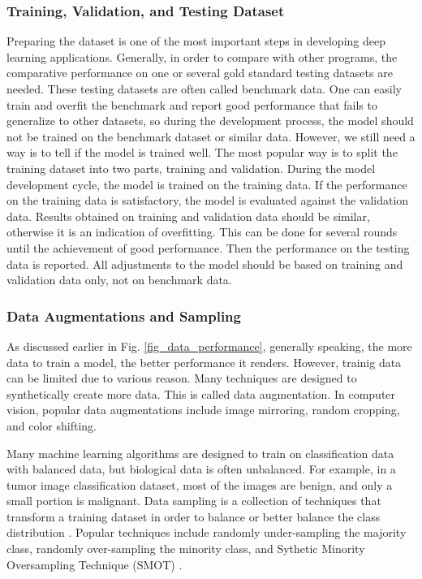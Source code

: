 \subsubsection{Training, Validation, and Testing Dataset}
Preparing the dataset is one of the most important steps in developing deep learning applications. Generally, in order to compare with other programs, the comparative performance on one or several gold standard testing datasets are needed. These testing datasets are often called benchmark data. One can easily train and overfit the benchmark and report good performance that fails to generalize to other datasets, so during the development process, the model should not be trained on the benchmark dataset or similar data. However, we still need a way is to tell if the model is trained well. The most popular way is to split the training dataset into two parts, training and validation. During the model development cycle, the model is trained on the training data. If the performance on the training data is satisfactory, the model is evaluated against the validation data. Results obtained on training and validation data should be similar, otherwise it is an indication of overfitting. This can be done for several rounds until the achievement of good performance. Then the performance on the testing data is reported. All adjustments to the model should be based on training and validation data only, not on benchmark data.
\subsubsection{Data Augmentations and Sampling}
As discussed earlier in Fig. \ref{fig_data_performance}, generally speaking, the more data to train a model, the better performance it renders. However, trainig data can be limited due to various reason. Many techniques are designed to synthetically create more data. This is called data augmentation. In computer vision, popular data augmentations include image mirroring, random cropping, and color shifting.  

Many machine learning algorithms are designed to train on classification data with balanced data, but biological data is often unbalanced. For example, in a tumor image classification dataset, most of the images are benign, and only a small portion is malignant. Data sampling is a collection of techniques that transform a training dataset in order to balance or better balance the class distribution \cite{chawla2004special}. Popular techniques include randomly under-sampling the majority class, randomly over-sampling the minority class, and Sythetic Minority Oversampling Technique (SMOT) \cite{chawla2002smote}.
